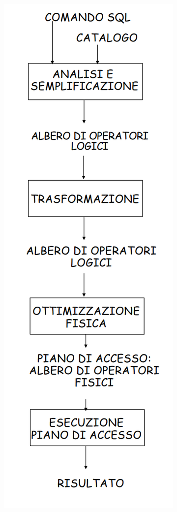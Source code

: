 \documentclass[10pt]{book}
\begin{document}
\begin{multicols}{2}
	\begin{center}
		\includegraphics[scale=0.5]{ottimizz.png}
	\end{center}

\end{multicols}
\end{document}
